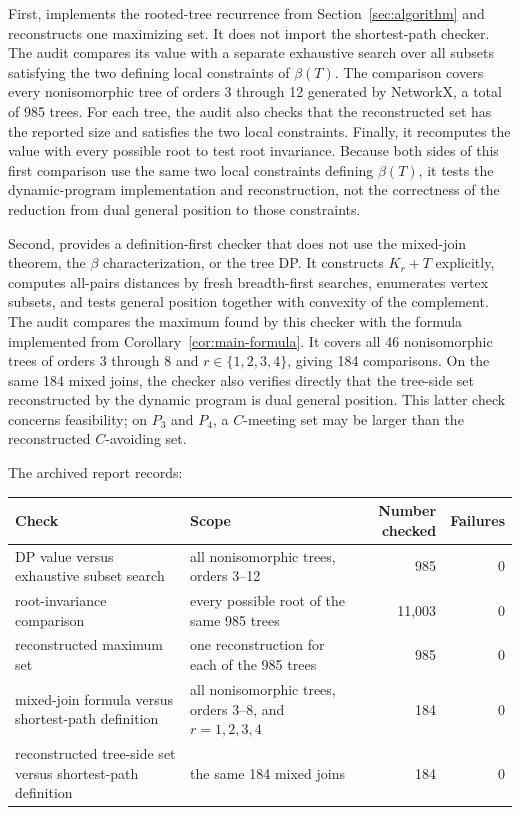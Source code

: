 \documentclass[preprint,12pt]{elsarticle}
\providecommand{\Needspace}[1]{}
\numberwithin{equation}{section}
\begin{document}
First,  implements the rooted-tree
recurrence from Section~\ref{sec:algorithm} and reconstructs one maximizing set. It does
not import the shortest-path checker. The audit compares its value with
a separate exhaustive search over all subsets satisfying the two
defining local constraints of \(\beta(T)\). The comparison covers every
nonisomorphic tree of orders 3 through 12 generated by NetworkX, a total
of 985 trees. For each tree, the audit also checks that the
reconstructed set has the reported size and satisfies the two local
constraints. Finally, it recomputes the value with every possible root
to test root invariance. Because both sides of this first comparison use the
same two local constraints defining \(\beta(T)\), it tests the dynamic-program
implementation and reconstruction, not the correctness of the reduction from
dual general position to those constraints.

Second,  provides a
definition-first checker that does not use the mixed-join theorem, the
\(\beta\) characterization, or the tree DP. It constructs \(K_r+T\)
explicitly, computes all-pairs distances by fresh breadth-first
searches, enumerates vertex subsets, and tests general position together
with convexity of the complement. The audit compares the maximum found
by this checker with the formula implemented from Corollary~\ref{cor:main-formula}. It
covers all 46 nonisomorphic trees of orders 3 through 8 and
\(r\in\{1,2,3,4\}\), giving 184 comparisons.
On the same 184 mixed joins, the checker also verifies directly that the
tree-side set reconstructed by the dynamic program is dual general position.
This latter check concerns feasibility; on \(P_3\) and \(P_4\), a
\(C\)-meeting set may be larger than the reconstructed \(C\)-avoiding set.

\Needspace{8\baselineskip}
The archived report 
records:

\begin{longtable}[]{@{}L{0.21\textwidth}L{0.34\textwidth}rr@{}}
\toprule
Check & Scope & Number checked & Failures \\
\midrule
\endhead
DP value versus exhaustive subset search & all nonisomorphic trees,
orders 3--12 & 985 & 0 \\
root-invariance comparison & every possible root of the same 985 trees &
11,003 & 0 \\
reconstructed maximum set & one reconstruction for each of the 985 trees
& 985 & 0 \\
mixed-join formula versus shortest-path definition & all nonisomorphic
trees, orders 3--8, and \(r=1,2,3,4\) & 184 & 0 \\
reconstructed tree-side set versus shortest-path definition & the same
184 mixed joins & 184 & 0 \\
\bottomrule
\end{longtable}
\end{document}
